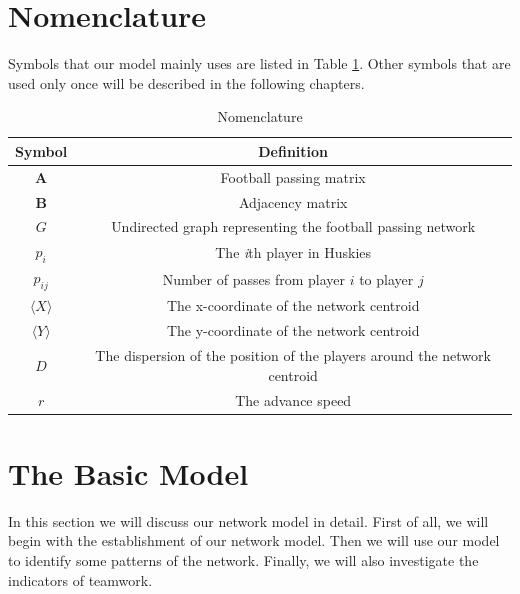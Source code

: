\documentclass{mcmthesis}
\begin{document}
\section{Nomenclature}
	Symbols that our model mainly uses are listed in Table \ref{tab:Nomen}.  Other symbols that are used only once will be described in the following chapters.
	\begin{table}
    	\centering
    	\caption{Nomenclature}
		\label{tab:Nomen}
		\begin{tabular}{c c}
			\hline	
				Symbol & Definition\\
			\hline
				$\textbf{A}$ & Football passing matrix\\
				$\textbf{B}$ & Adjacency matrix\\
				$G$ & Undirected graph representing the football passing network\\
				$p_{i}$ & The \emph{i}th player in Huskies\\
				$p_{ij}$ & Number of passes from player $i$ to player $j$\\
				$\langle$$X$$\rangle$ & The x-coordinate of the network centroid\\
				$\langle$$Y$$\rangle$ & The y-coordinate of the network centroid\\
				$D$ & The dispersion of the position of the players around the network centroid\\
				$r$ & The advance speed\\
			\hline
   	 	\end{tabular}
	\end{table}

\section{The Basic Model}
	In this section we will discuss our network model in detail.  First of all, we will begin with the establishment of our network model.  Then we will use our model to identify some patterns of the network.  Finally, we will also investigate the indicators of teamwork. 
\end{document}
